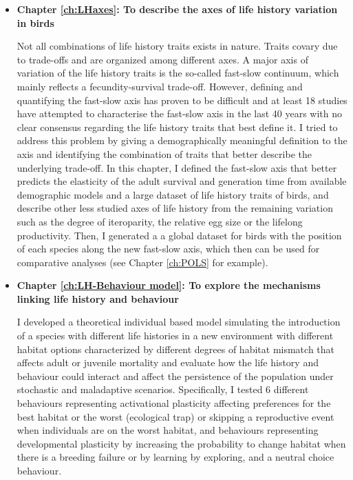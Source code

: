 \begin{itemize}
\item \textbf{Chapter \ref{ch:LHaxes}: To describe the axes of life history 
variation in birds}

Not all combinations of life history traits exists in nature. Traits covary
due to trade-offs and are organized among different axes. A major axis
of variation of the life history traits is the so-called fast-slow continuum,
which mainly reflects a fecundity-survival trade-off. However, defining and
quantifying the fast-slow axis has proven to be difficult and at least 18
studies have attempted to characterise the fast-slow axis in the last 40 years
with no clear consensus regarding the life history traits that best define it.
I tried to address this problem by giving a demographically meaningful
definition to the axis and identifying the combination of traits that better
describe the underlying trade-off.
In this chapter, I defined the fast-slow axis that better predicts the 
elasticity of the adult survival and generation time from available demographic 
models and a large dataset of life history traits of birds, and describe other
less studied axes of life history from the remaining variation such as the
degree of iteroparity, the relative egg size or the lifelong productivity. Then,
I generated a a global dataset for birds with the position of each species along
the new fast-slow axis, which then can be used for comparative analyses (see
Chapter \ref{ch:POLS} for example).
\bigskip


\item \textbf{Chapter \ref{ch:LH-Behaviour model}: To explore the mechanisms 
linking life history and behaviour}

I developed a theoretical individual based model simulating the introduction of
a species with different life histories in a new environment with different
habitat options characterized by different degrees of habitat mismatch that
affects adult or juvenile mortality and evaluate how the life history and
behaviour could interact and affect the persistence of the population under
stochastic and maladaptive scenarios. Specifically, I tested 6 different
behaviours representing activational plasticity affecting preferences for the
best habitat or the worst (ecological trap) or skipping a reproductive event
when individuals are on the worst habitat, and behaviours representing
developmental plasticity by increasing the probability to change habitat
when there is a breeding failure or by learning by exploring, and a neutral
choice behaviour.
\bigskip



\end{itemize}
